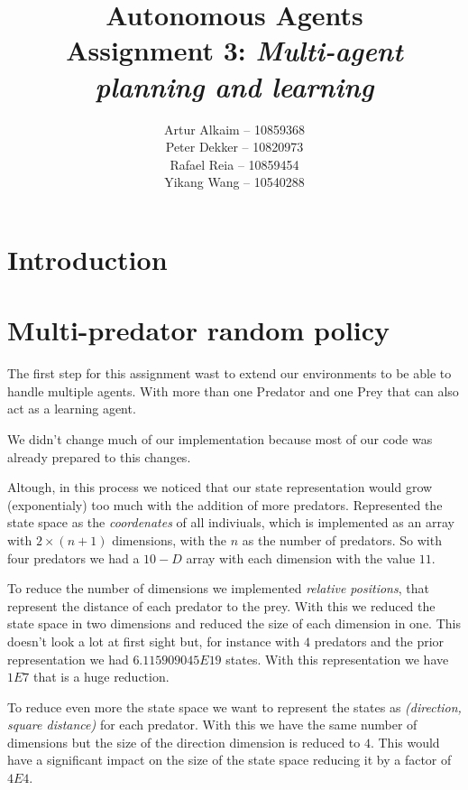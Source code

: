 \documentclass{article}
\begin{document}
\title{Autonomous Agents\\
Assignment 3: \emph{Multi-agent planning and learning}}
\author{
Artur Alkaim -- 10859368\\
Peter Dekker -- 10820973\\
Rafael Reia -- 10859454\\
Yikang Wang -- 10540288\\
}
\maketitle
\section{Introduction}

\section{Multi-predator random policy}
The first step for this assignment wast to extend our environments to be able to
handle multiple agents. With more than one Predator and one Prey that can also
act as a learning agent.

We didn't change much of our implementation because most of our code was
already prepared to this changes.

Altough, in this process we noticed that our state representation would grow
(exponentialy) too much with the addition of more predators. Represented the
state space as the \emph{coordenates} of all indiviuals, which is implemented as
an array with $2 \times (n+1)$ dimensions, with the $n$ as the number of predators. So with four predators we had a $10-D$ array with each 
dimension with the value $11$. 

To reduce the number of dimensions we implemented \emph{relative positions},
that represent the distance of each predator to the prey. With this we reduced the
state space in two dimensions and reduced the size of each dimension in one.
This doesn't look a lot at first sight but, for instance with $4$ predators and
the prior representation we had $6.115909045E19$ states. With this
representation we have $1E7$ that is a huge reduction.

To reduce even more the state space we want to represent the states as
\emph{(direction, square distance)} for each predator. With this we have the
same number of dimensions but the size of the direction dimension is reduced to $4$.
This would have a significant impact on the size of the state space reducing it
by a factor of $4E4$.
\end{document}
